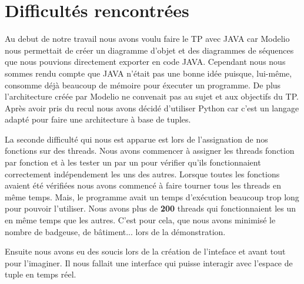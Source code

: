 \documentclass[a4paper,10pt]{article}
\begin{document}
    \section{Difficultés rencontrées}
    \label{difficulty}
    \par Au debut de notre travail nous avons voulu faire le TP avec JAVA car Modelio nous permettait de créer un diagramme d'objet et des diagrammes de séquences que nous pouvions directement exporter en code JAVA.
    Cependant nous nous sommes rendu compte que JAVA n'était pas une bonne idée puisque, lui-même, consomme déjà beaucoup de mémoire pour éxecuter un programme.
    De plus l'architecture créée par Modelio ne convenait pas au sujet et aux objectifs du TP. Après avoir pris du recul nous avons décidé d'utiliser Python car c'est un langage adapté pour faire une architecture à base de tuples.
    \\
    \par
    La seconde difficulté qui nous est apparue est lors de l'assignation de nos fonctions sur des threads. Nous avons commencer à assigner les threads fonction par fonction et à les tester un par un pour vérifier qu'ils fonctionnaient correctement indépendement les uns des autres. Lorsque toutes les fonctions avaient été vérifiées nous avons commencé à faire tourner tous les threads en même temps. Mais, le programme avait un temps d'exécution beaucoup trop long pour pouvoir l'utiliser. Nous avons plus de \textbf{200} threads qui fonctionnaient les un en même temps que les autres. C'est pour cela, que nous avons minimisé le nombre de badgeuse, de bâtiment... lors de la démonstration.
    \\
    \par
     Ensuite nous avons eu des soucis lors de la création de l'inteface et avant tout pour l'imaginer. Il nous fallait une interface qui puisse interagir avec l'espace de tuple en temps réel.

    \pagebreak
    
\end{document}
